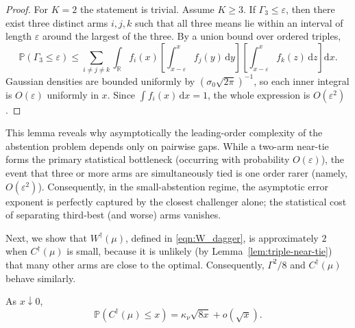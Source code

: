\documentclass[10pt]{article}
\newcommand{\dd}{\mathrm{d}}
\theoremstyle{plain}
\begin{document}
\begin{proof}
For $K=2$ the statement is trivial. Assume $K\ge3$.
If $\Gamma_3\le \varepsilon$, then there exist three distinct arms $i,j,k$
such that all three means lie within an interval of length $\varepsilon$ around
the largest of the three. By a union bound over ordered triples,
\[
\mathbb P(\Gamma_3\le \varepsilon)
\le
\sum_{i\neq j\neq k}
\int_{\mathbb R}
f_i(x)
\left[
\int_{x-\varepsilon}^x f_j(y)\,\dd y
\right]
\left[
\int_{x-\varepsilon}^x f_k(z)\,\dd z
\right]\dd x.
\]
Gaussian densities are bounded uniformly by $(\sigma_0\sqrt{2\pi})^{-1}$, so each
inner integral is $O(\varepsilon)$ uniformly in $x$. Since $\int f_i(x)\,\dd x=1$,
the whole expression is $O(\varepsilon^2)$.  
\end{proof}

\begin{remark}
    This lemma reveals why asymptotically the leading-order complexity of the abstention problem depends only on pairwise gaps. While a two-arm near-tie forms the primary statistical bottleneck (occurring with probability $O(\varepsilon)$), the event that three or more arms are simultaneously tied is one order rarer (namely, $O(\varepsilon^2)$). Consequently, in the small-abstention regime, the asymptotic error exponent is perfectly captured by the closest challenger alone; the statistical cost of separating third-best (and worse) arms vanishes. %
\end{remark} 


Next, we show that $W^\dagger(\mu)$, defined in \eqref{eqn:W_dagger}, is approximately $2$ when $C^\dagger(\mu)$ is small, because it is unlikely (by  Lemma~\ref{lem:triple-near-tie}) that many other arms are close to the optimal. Consequently, $\Gamma^2/8$ and $C^\dagger(\mu)$ behave similarly.


\begin{lemma}
\label{lem:Cdagger-tail}
As $x\downarrow0$,
\begin{equation}
    \mathbb P(C^\dagger(\mu)\le x)
=
\kappa_\nu\sqrt{8x}
+
o(\sqrt x). \label{eqn:Cdagger}
\end{equation}
\end{lemma}
\end{document}

